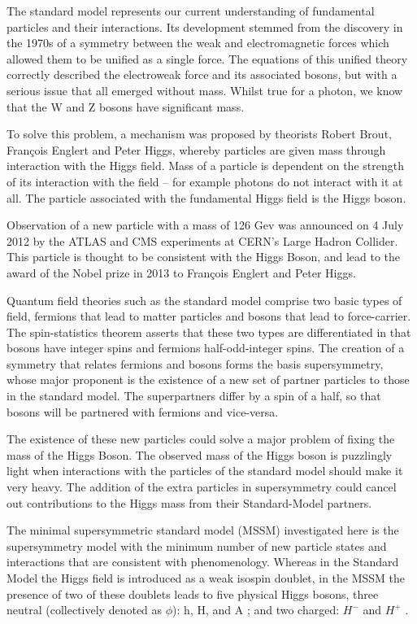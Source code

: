 The standard model represents our current understanding of fundamental particles and their interactions. Its development stemmed from the discovery in the 1970s of a symmetry between the weak and electromagnetic forces which allowed them to be unified as a single force. The equations of this unified theory correctly described the electroweak force and its associated bosons, but with a serious issue that all emerged without mass. Whilst true for a photon, we know that the W and Z bosons have significant mass\cite{CERN:aa}.

To solve this problem, a mechanism was proposed by theorists Robert Brout, François Englert and Peter Higgs, whereby particles are given mass through interaction with the Higgs field. Mass of a particle is dependent on the strength of its interaction with the field – for example photons do not interact with it at all. The particle associated with the fundamental Higgs field is the Higgs boson\cite{CERN:aa}.

Observation of a new particle with a mass of 126 Gev was announced on 4 July 2012 by the ATLAS and CMS experiments at CERN's Large Hadron Collider. This particle is thought to be consistent with the Higgs Boson, and lead to the award of the Nobel prize in 2013 to François Englert and Peter Higgs.


Quantum field theories such as the standard model comprise two basic types of field, fermions that lead to matter particles and bosons that lead to force-carrier. The spin-statistics theorem asserts that these two types are differentiated in that bosons have integer spins and fermions half-odd-integer spins. The creation of a symmetry that relates fermions and bosons forms the basis supersymmetry, whose major proponent is the existence of a new set of partner particles to those in the standard model. The superpartners differ by a spin of a half, so that bosons will be partnered with fermions and vice-versa\cite{Neil-Lambert:aa}. 

The existence of these new particles could solve a major problem of fixing the mass of the Higgs Boson. The observed mass of the Higgs boson is puzzlingly light when interactions with the particles of the standard model should make it very heavy. The addition of the extra particles in supersymmetry could cancel out contributions to the Higgs mass from their Standard-Model partners. 

The minimal supersymmetric standard model (MSSM) investigated here is the supersymmetry model with the minimum number of new particle states and interactions that are consistent with phenomenology\cite{baer2006weak}. Whereas in the Standard Model the Higgs field is introduced as a weak isospin doublet, in the
MSSM the presence of two of these doublets leads to five physical Higgs bosons, three neutral (collectively denoted as $\phi$): h, H, and A ; and two charged: $H^-$ and $H^+$ \cite{Abazov201197}.

